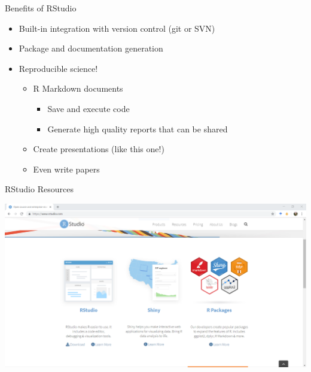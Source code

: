 \documentclass[
  ignorenonframetext,
]{beamer}
\providecommand{\tightlist}{%
  \setlength{\itemsep}{0pt}\setlength{\parskip}{0pt}}
\begin{document}
\begin{frame}{Benefits of RStudio}
\protect\hypertarget{benefits-of-rstudio}{}

\begin{itemize}
\tightlist
\item
  Built-in integration with version control (git or SVN)
\item
  Package and documentation generation
\item
  Reproducible science!

  \begin{itemize}
  \tightlist
  \item
    R Markdown documents

    \begin{itemize}
    \tightlist
    \item
      Save and execute code
    \item
      Generate high quality reports that can be shared
    \end{itemize}
  \item
    Create presentations (like this one!)
  \item
    Even write papers
  \end{itemize}
\end{itemize}

\end{frame}

\begin{frame}{RStudio Resources}
\protect\hypertarget{rstudio-resources}{}

\includegraphics{../external/images/rstudio_dot_com_1_main.PNG}

\end{frame}
\end{document}
